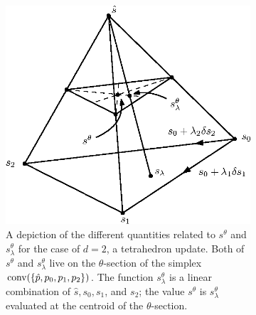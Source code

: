 \documentclass[sisc-eikonal.tex]{subfiles}
\begin{document}
\begin{figure}
  \centering
  \begin{subfigure}{.5\textwidth}
    \centering
    \includegraphics[width=\linewidth]{slowness-tetra.eps}
    \caption{A depiction of the different quantities related to
      $s^{\theta}$ and $s^{\theta}_\lambda$ for the case of $d = 2$, a
      tetrahedron update. Both of $s^\theta$ and $s^\theta_\lambda$ live
      on the $\theta$-section of the simplex
      $\operatorname{conv}(\left\{\hat{p}, p_0, p_1, p_2\right\})$. The function
      $s^\theta_\lambda$ is a linear combination of $\hat{s}, s_0, s_1$,
      and $s_2$; the value $s^\theta$ is $s^\theta_\lambda$ evaluated at
      the centroid of the $\theta$-section.}\label{fig:slowness-tetra}
  \end{subfigure}%
  \hspace{.05\linewidth}
  \begin{subfigure}{.44\textwidth}
    \centering

\end{subfigure}
\end{figure}
\end{document}
